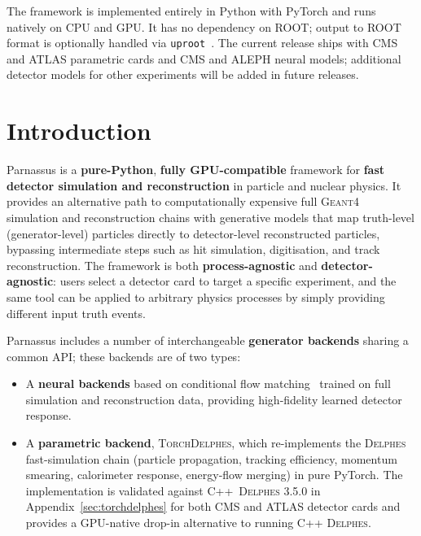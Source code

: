 \documentclass[11pt,a4paper]{article}          %
\begin{document}
\begin{small}
\begin{description}[style=nextline, leftmargin=4.5cm, labelwidth=4.3cm,
  labelsep=0.2cm, font=\normalfont\itshape, itemsep=2pt]
\item[Additional comments including restrictions and unusual features:]
  The framework is implemented entirely in Python with PyTorch and runs
  natively on CPU and GPU. It has no dependency on
  ROOT; output to ROOT format is optionally handled via
  \texttt{uproot}~\cite{uproot}. The current release ships with CMS and
  ATLAS parametric cards and CMS and ALEPH neural models; additional detector
  models for other experiments will be added in future releases.

\end{description}
\end{small}

\section{Introduction}
\label{sec:introduction}

Parnassus is a \textbf{pure-Python}, \textbf{fully GPU-compatible} framework for
\textbf{fast detector simulation and reconstruction} in particle and nuclear physics. It provides an alternative path to computationally expensive full
\textsc{Geant4}~\cite{geant4} simulation and reconstruction chains with
generative models that map truth-level (generator-level) particles directly to
detector-level reconstructed particles,
bypassing intermediate steps such as hit simulation, digitisation, and track
reconstruction. The framework is both \textbf{process-agnostic} and
\textbf{detector-agnostic}: users select a detector card to target a specific
experiment, and the same tool can be applied to arbitrary physics processes by
simply providing different input truth events.

Parnassus includes a number of interchangeable \textbf{generator backends} sharing a
common API; these backends are of two types:
\begin{itemize}
  \item A \textbf{neural backends} based on conditional flow
    matching~\cite{lipman2023flow,liu2023flow} trained on full simulation and
    reconstruction data, providing high-fidelity learned detector response.
  \item A \textbf{parametric backend}, \textsc{TorchDelphes}, which
    re-implements the \textsc{Delphes}~\cite{delphes} fast-simulation chain
    (particle propagation, tracking efficiency, momentum smearing, calorimeter
    response, energy-flow merging) in pure PyTorch. The implementation is
    validated against C++~\textsc{Delphes} 3.5.0 in Appendix~\ref{sec:torchdelphes} for both CMS and ATLAS
    detector cards and provides a GPU-native drop-in alternative to running
    C++ \textsc{Delphes}.
\end{itemize}
\end{document}
